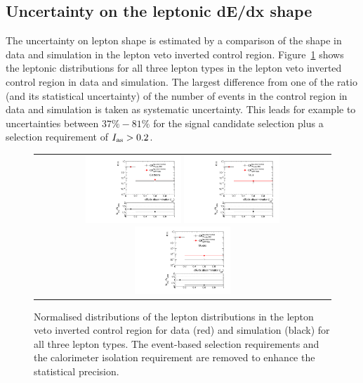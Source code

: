 \subsection{Uncertainty on the leptonic dE/dx shape}
\label{sec:LeptonIasUncertainty}

The uncertainty on lepton \ias shape is estimated by a comparison of the \ias shape in data and simulation in the lepton veto inverted control region.
Figure~\ref{fig:LeptonIasUnc} shows the leptonic \ias distributions for all three lepton types in the lepton veto inverted control region in data and simulation.
The largest difference from one  of the ratio (and its statistical uncertainty) of the number of events in the control region in data and simulation is taken as systematic uncertainty.
This leads for example to uncertainties between $37\%-81\%$ for the signal candidate selection plus a selection requirement of $I_{\text{as}}>0.2$.

\begin{figure}[!h]
  \centering 
  \begin{tabular}{c}
    \includegraphics[width=0.33\textwidth]{figures/analysis_2/Background/hASmi_SRbinning_Electrons_MCCR_DataCR.pdf}
    \includegraphics[width=0.33\textwidth]{figures/analysis_2/Background/hASmi_SRbinning_Taus_MCCR_DataCR.pdf}
    \includegraphics[width=0.33\textwidth]{figures/analysis_2/Background/hASmi_SRbinning_Muons_MCCR_DataCR.pdf}
  \end{tabular}
  \caption{Normalised distributions of the lepton \ias distributions in the lepton veto inverted control region for data (red) and simulation (black) for all three lepton types. 
           The event-based selection requirements and the calorimeter isolation requirement are removed to enhance the statistical precision.}
  \label{fig:LeptonIasUnc}
\end{figure}

